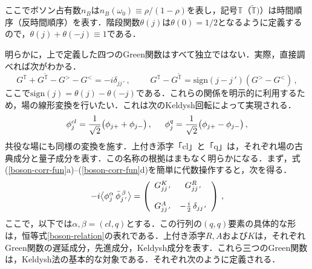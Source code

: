 \documentclass[a4paper,11pt]{ltjsarticle}
\begin{document}
ここでボソン占有数$n_B$は$n_B(\omega_0)
\equiv \rho/(1-\rho)$を表し，記号$\mathbb{T}$（$\widetilde{\mathbb{T}})$）は時間順序（反時間順序）を表す．階段関数$\theta(j)$は$\theta(0)=1/2$となるように定義するので，$\theta(j)+\theta(-j)\equiv 1$である．


明らかに，上で定義した四つのGreen関数はすべて独立ではない．実際，直接調べれば次がわかる．
\begin{subequations}
\begin{equation}\label{boson-relation}
G^{\mathbb{T}}
+G^{\widetilde{\mathbb{T}}}-G^{>}-G^{<}=-i\delta_{jj\,'}\,,\qquad\,\,
\end{equation}
\begin{equation}\label{boson-relation-1}
G^{\mathbb{T}}-G^{\widetilde{\mathbb{T}}}=\mbox{sign}(j-j\,')\left(G^{>}-
G^{<}\right)\,,
\end{equation}\end{subequations}
ここで$\mbox{sign}(j)=\theta(j)-\theta(-j)$である．これらの関係を明示的に利用するため，場の線形変換を行いたい．これは次のKeldysh回転によって実現される．
\begin{equation}\label{boson-rotation}
\phi^{cl}_{j}={1\over \sqrt{2}}\big(\phi_{j+} +\phi_{j-}\big) \, ,
\,\,\,\,\,\,\,\,\, \phi^{q}_{j}={1\over\sqrt{2}}\big(\phi_{j+}-
\phi_{j-}\big)\,,
\end{equation}共役な場にも同様の変換を施す．上付き添字「cl」と「q」は，それぞれ場の古典成分と量子成分を表す．この名称の根拠はまもなく明らかになる．まず，式(\ref{boson-corr-fun}a)--(\ref{boson-corr-fun}d)を簡単に代数操作すると，次を得る．
\begin{equation}\label{boson-G-fun-1}
-i\big\langle\phi^{\alpha}_{j}\,\bar\phi^{\,\beta}_{j\,'}\big\rangle
= \left(\begin{array}{cc} G^K_{jj\,'} & G^{R}_{jj\,'} \\ \frac{}{} &
\frac{}{}
\\G^{A}_{jj\,'} & -{i\over 2}\,\delta_{jj\,'}
\end{array}\right)\, ,
\end{equation}ここで，以下では$\alpha, \beta = (cl,q)$とする．この行列の$(q,q)$要素の具体的な形は，恒等式\eqref{boson-relation}の表れである．上付き添字$R,A$および$K$は，それぞれGreen関数の遅延成分，先進成分，Keldysh成分を表す．これら三つのGreen関数は，Keldysh法の基本的な対象である．それぞれ次のように定義される．
\end{document}
